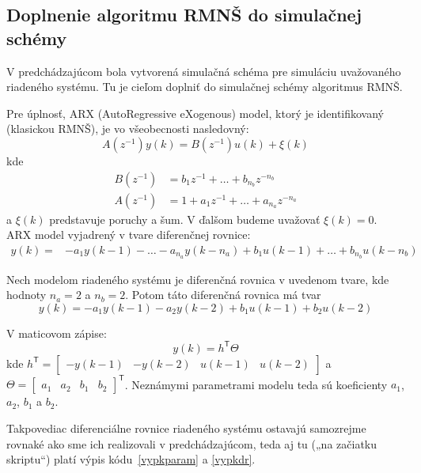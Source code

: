 \documentclass[a4paper, 10pt, ]{article}
\begin{document}
\subsection{Doplnenie algoritmu RMNŠ do simulačnej schémy}


V predchádzajúcom bola vytvorená simulačná schéma pre simuláciu uvažovaného riadeného systému. Tu je cieľom doplniť do simulačnej schémy algoritmus RMNŠ.

Pre úplnosť, ARX (AutoRegressive eXogenous) model, ktorý je identifikovaný (klasickou RMNŠ), je vo všeobecnosti nasledovný:
\begin{equation}
	A(z^{-1})y(k) = B(z^{-1})u(k) + \xi(k)
\end{equation}
kde
\begin{equation}
	\begin{split}
		 B(z^{-1}) &= b_1z^{-1} + \ldots + b_{n_b}z^{-n_b} \\
		 A(z^{-1}) &= 1 + a_1z^{-1} + \ldots + a_{n_a}z^{-n_a}
	\end{split}
\end{equation}
a $\xi(k)$ predstavuje poruchy a šum. V ďalšom budeme uvažovať $\xi(k) = 0$. ARX model vyjadrený v tvare diferenčnej rovnice:
\begin{equation}
	\begin{split}
		y(k) = & -a_1y(k-1) - \ldots - a_{n_a}y(k-n_a) +  b_1u(k-1) + \ldots + b_{n_b}u(k-n_b)
	\end{split}
\end{equation}


Nech modelom riadeného systému je diferenčná rovnica v uvedenom tvare, kde hodnoty $n_a = 2$ a $n_b = 2$. Potom táto diferenčná rovnica má tvar
\begin{equation}
	y(k) =  - a_1y(k-1) - a_2y(k-2) + b_1u(k-1) + b_2u(k-2)
\end{equation}

V maticovom zápise:
\begin{equation}
	y(k) = h^\mathsf T \Theta
\end{equation}
kde $h^\mathsf T = \begin{bmatrix} -y(k-1) & -y(k-2) & u(k-1) & u(k-2) \end{bmatrix}$  a $\Theta = \begin{bmatrix} a_1 & a_2 & b_1 & b_2 \end{bmatrix}^\mathsf T$.
Neznámymi parametrami modelu teda sú koeficienty $a_1$, $a_2$, $b_1$ a $b_2$.


\bigskip

\noindent
Takpovediac diferenciálne rovnice riadeného systému ostavajú samozrejme rovnaké ako sme ich realizovali v predchádzajúcom, teda aj tu („na začiatku skriptu“) platí výpis kódu~\ref{vypkparam} a \ref{vypkdr}.
\end{document}
